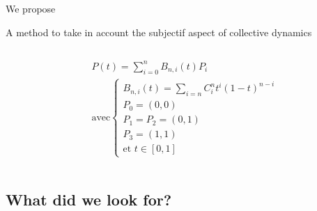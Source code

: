\documentclass{beamer}
\begin{document}
\begin{frame}{We propose}
{\begin{block}{A method to take in account the subjectif aspect of collective dynamics}
{\begin{columns}
          \begin{column}{.5\textwidth}
            \begin{align*}
              &P(t)=\sum_{i=0}^nB_{n,i}(t)P_i\\
              &\text{avec} \left \{
                \begin{aligned}
                  B_{n,i}(t)=\sum_{i=n}C_i^nt^i(1-t)^{n-i} \\
                  P_0=(0,0) \\
                  P_1=P_2=(0,1)\\
                  P_3=(1,1)\\
                  \text{et } t \in [0,1]
                \end{aligned} \right .
            \end{align*}
          \end{column}
        \end{columns}
      }
    \end{block}
  }

\end{frame}

\subsection{What did we look for?}
\end{document}
